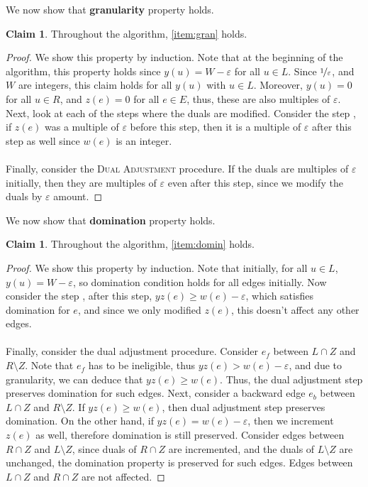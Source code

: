 \documentclass[a4paper,11pt]{article}
\newcommand{\eps}{\varepsilon}
\theoremstyle{definition}
\theoremstyle{definition}
\theoremstyle{definition}
\theoremstyle{definition}
\theoremstyle{definition}
\theoremstyle{definition}
\theoremstyle{definition}
\theoremstyle{definition}
\newtheorem{claim2}[definition2]{Claim}
\theoremstyle{definition}
\theoremstyle{definition}
\theoremstyle{definition}
\theoremstyle{definition}
\theoremstyle{definition}
\theoremstyle{definition}
\theoremstyle{definition}
\begin{document}
We now show that \textbf{granularity} property holds.
\begin{claim2}\label{proof:gran}
    Throughout the algorithm, \ref{item:gran} holds.
\end{claim2}
\begin{proof}
We show this property by induction. Note that at the beginning of the algorithm, this property holds since $y(u)=W-\eps$ for all $u\in L$. Since $\nicefrac{1}{\eps}$, and $W$ are integers, this claim holds for all $y(u)$ with $u\in L$. Moreover, $y(u)=0$ for all $u\in R$, and $z(e)=0$ for all $e\in E$, thus, these are also multiples of $\eps$. Next, look at each of the steps where the duals are modified. Consider the step , if $z(e)$ was a multiple of $\eps$ before this step, then it is a multiple of $\eps$ after this step as well since $w(e)$ is an integer. \\ \\
Finally, consider the \textsc{Dual Adjustment} procedure. If the duals are multiples of $\eps$ initially, then they are multiples of $\eps$ even after this step, since we modify the duals by $\eps$ amount. 
\end{proof}
We now show that \textbf{domination} property holds.
\begin{claim2}
Throughout the algorithm, \ref{item:domin} holds.
\end{claim2}
\begin{proof}
We show this property by induction. Note that initially, for all $u\in L$, $y(u)=W-\eps$, so domination condition holds for all edges initially. Now consider the step , after this step, $yz(e)\geqslant w(e)-\eps$, which satisfies domination for $e$, and since we only modified $z(e)$, this doesn't affect any other edges. \\ \\
Finally, consider the dual adjustment procedure. Consider $e_f$ between $L\cap Z$ and $R\setminus Z$. Note that $e_f$ has to be ineligible, thus $yz(e)>w(e)-\eps$, and due to granularity, we can deduce that $yz(e)\geqslant w(e)$. Thus, the dual adjustment step preserves domination for such edges. Next, consider a backward edge $e_b$ between $L\cap Z$ and $R\setminus Z$. If $yz(e)\geqslant w(e)$, then dual adjustment step preserves domination. On the other hand, if $yz(e)=w(e)-\eps$, then we increment $z(e)$ as well, therefore domination is still preserved. Consider edges between $R\cap Z$ and $L\setminus Z$, since duals of $R\cap Z$ are incremented, and the duals of $L\setminus Z$ are unchanged, the domination property is preserved for such edges. Edges between $L\cap Z$ and $R\cap Z$ are not affected. 
\end{proof}
\end{document}
